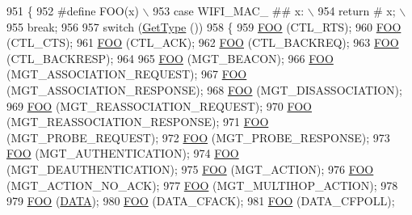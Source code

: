 \begin{DoxyCode}
951 \{
952 \textcolor{preprocessor}{#define FOO(x) \(\backslash\)}
953 \textcolor{preprocessor}{case WIFI\_MAC\_ ## x: \(\backslash\)}
954 \textcolor{preprocessor}{  return # x; \(\backslash\)}
955 \textcolor{preprocessor}{  break;}
956 
957   \textcolor{keywordflow}{switch} (\hyperlink{classns3_1_1WifiMacHeader_a393067652a2b6c06d645366912ddf748}{GetType} ())
958     \{
959       \hyperlink{wifi-mac-header_8cc_a528ac17e4c796a1c47ff9631664c51f0}{FOO} (CTL\_RTS);
960       \hyperlink{wifi-mac-header_8cc_a528ac17e4c796a1c47ff9631664c51f0}{FOO} (CTL\_CTS);
961       \hyperlink{wifi-mac-header_8cc_a528ac17e4c796a1c47ff9631664c51f0}{FOO} (CTL\_ACK);
962       \hyperlink{wifi-mac-header_8cc_a528ac17e4c796a1c47ff9631664c51f0}{FOO} (CTL\_BACKREQ);
963       \hyperlink{wifi-mac-header_8cc_a528ac17e4c796a1c47ff9631664c51f0}{FOO} (CTL\_BACKRESP);
964 
965       \hyperlink{wifi-mac-header_8cc_a528ac17e4c796a1c47ff9631664c51f0}{FOO} (MGT\_BEACON);
966       \hyperlink{wifi-mac-header_8cc_a528ac17e4c796a1c47ff9631664c51f0}{FOO} (MGT\_ASSOCIATION\_REQUEST);
967       \hyperlink{wifi-mac-header_8cc_a528ac17e4c796a1c47ff9631664c51f0}{FOO} (MGT\_ASSOCIATION\_RESPONSE);
968       \hyperlink{wifi-mac-header_8cc_a528ac17e4c796a1c47ff9631664c51f0}{FOO} (MGT\_DISASSOCIATION);
969       \hyperlink{wifi-mac-header_8cc_a528ac17e4c796a1c47ff9631664c51f0}{FOO} (MGT\_REASSOCIATION\_REQUEST);
970       \hyperlink{wifi-mac-header_8cc_a528ac17e4c796a1c47ff9631664c51f0}{FOO} (MGT\_REASSOCIATION\_RESPONSE);
971       \hyperlink{wifi-mac-header_8cc_a528ac17e4c796a1c47ff9631664c51f0}{FOO} (MGT\_PROBE\_REQUEST);
972       \hyperlink{wifi-mac-header_8cc_a528ac17e4c796a1c47ff9631664c51f0}{FOO} (MGT\_PROBE\_RESPONSE);
973       \hyperlink{wifi-mac-header_8cc_a528ac17e4c796a1c47ff9631664c51f0}{FOO} (MGT\_AUTHENTICATION);
974       \hyperlink{wifi-mac-header_8cc_a528ac17e4c796a1c47ff9631664c51f0}{FOO} (MGT\_DEAUTHENTICATION);
975       \hyperlink{wifi-mac-header_8cc_a528ac17e4c796a1c47ff9631664c51f0}{FOO} (MGT\_ACTION);
976       \hyperlink{wifi-mac-header_8cc_a528ac17e4c796a1c47ff9631664c51f0}{FOO} (MGT\_ACTION\_NO\_ACK);
977       \hyperlink{wifi-mac-header_8cc_a528ac17e4c796a1c47ff9631664c51f0}{FOO} (MGT\_MULTIHOP\_ACTION);
978 
979       \hyperlink{wifi-mac-header_8cc_a528ac17e4c796a1c47ff9631664c51f0}{FOO} (\hyperlink{namespacens3_a534f9a14e4d9aeb5b400e61f152a73a2ae87e0f8f47d5619e16355b1f8caca558}{DATA});
980       \hyperlink{wifi-mac-header_8cc_a528ac17e4c796a1c47ff9631664c51f0}{FOO} (DATA\_CFACK);
981       \hyperlink{wifi-mac-header_8cc_a528ac17e4c796a1c47ff9631664c51f0}{FOO} (DATA\_CFPOLL);

\end{DoxyCode}
